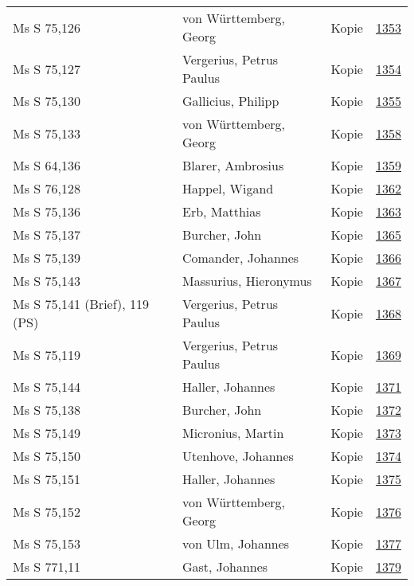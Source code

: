 \documentclass[10pt,a4paper,landscape]{report}
\begin{document}
\begin{longtable}{p{16cm}p{4cm}lr}
Ms S 75,126	&	von Württemberg, Georg	&	Kopie	&	\href{http://130.60.24.72/assignment/1353}{1353}\\
Ms S 75,127	&	Vergerius, Petrus Paulus	&	Kopie	&	\href{http://130.60.24.72/assignment/1354}{1354}\\
Ms S 75,130	&	Gallicius, Philipp	&	Kopie	&	\href{http://130.60.24.72/assignment/1355}{1355}\\
Ms S 75,133	&	von Württemberg, Georg	&	Kopie	&	\href{http://130.60.24.72/assignment/1358}{1358}\\
Ms S 64,136	&	Blarer, Ambrosius	&	Kopie	&	\href{http://130.60.24.72/assignment/1359}{1359}\\
Ms S 76,128	&	Happel, Wigand	&	Kopie	&	\href{http://130.60.24.72/assignment/1362}{1362}\\
Ms S 75,136	&	Erb, Matthias	&	Kopie	&	\href{http://130.60.24.72/assignment/1363}{1363}\\
Ms S 75,137	&	Burcher, John	&	Kopie	&	\href{http://130.60.24.72/assignment/1365}{1365}\\
Ms S 75,139	&	Comander, Johannes	&	Kopie	&	\href{http://130.60.24.72/assignment/1366}{1366}\\
Ms S 75,143	&	Massurius, Hieronymus	&	Kopie	&	\href{http://130.60.24.72/assignment/1367}{1367}\\
Ms S 75,141 (Brief), 119 (PS)	&	Vergerius, Petrus Paulus	&	Kopie	&	\href{http://130.60.24.72/assignment/1368}{1368}\\
Ms S 75,119	&	Vergerius, Petrus Paulus	&	Kopie	&	\href{http://130.60.24.72/assignment/1369}{1369}\\
Ms S 75,144	&	Haller, Johannes	&	Kopie	&	\href{http://130.60.24.72/assignment/1371}{1371}\\
Ms S 75,138	&	Burcher, John	&	Kopie	&	\href{http://130.60.24.72/assignment/1372}{1372}\\
Ms S 75,149	&	Micronius, Martin	&	Kopie	&	\href{http://130.60.24.72/assignment/1373}{1373}\\
Ms S 75,150	&	Utenhove, Johannes	&	Kopie	&	\href{http://130.60.24.72/assignment/1374}{1374}\\
Ms S 75,151	&	Haller, Johannes	&	Kopie	&	\href{http://130.60.24.72/assignment/1375}{1375}\\
Ms S 75,152	&	von Württemberg, Georg	&	Kopie	&	\href{http://130.60.24.72/assignment/1376}{1376}\\
Ms S 75,153	&	von Ulm, Johannes	&	Kopie	&	\href{http://130.60.24.72/assignment/1377}{1377}\\
Ms S 771,11	&	Gast, Johannes	&	Kopie	&	\href{http://130.60.24.72/assignment/1379}{1379}\\

\end{longtable}
\end{document}
